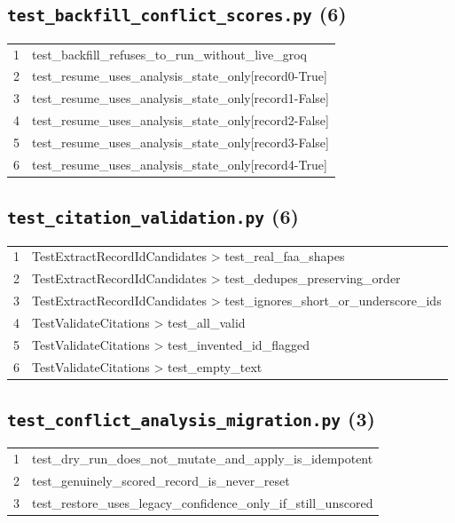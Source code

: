 \subsection*{\texttt{test\_backfill\_conflict\_scores.py} (6)}
\begin{longtable}{p{}p{}}
1 & test\_backfill\_refuses\_to\_run\_without\_live\_groq \\
2 & test\_resume\_uses\_analysis\_state\_only[record0-True] \\
3 & test\_resume\_uses\_analysis\_state\_only[record1-False] \\
4 & test\_resume\_uses\_analysis\_state\_only[record2-False] \\
5 & test\_resume\_uses\_analysis\_state\_only[record3-False] \\
6 & test\_resume\_uses\_analysis\_state\_only[record4-True] \\
\end{longtable}
\subsection*{\texttt{test\_citation\_validation.py} (6)}
\begin{longtable}{p{}p{}}
1 & TestExtractRecordIdCandidates > test\_real\_faa\_shapes \\
2 & TestExtractRecordIdCandidates > test\_dedupes\_preserving\_order \\
3 & TestExtractRecordIdCandidates > test\_ignores\_short\_or\_underscore\_ids \\
4 & TestValidateCitations > test\_all\_valid \\
5 & TestValidateCitations > test\_invented\_id\_flagged \\
6 & TestValidateCitations > test\_empty\_text \\
\end{longtable}
\subsection*{\texttt{test\_conflict\_analysis\_migration.py} (3)}
\begin{longtable}{p{}p{}}
1 & test\_dry\_run\_does\_not\_mutate\_and\_apply\_is\_idempotent \\
2 & test\_genuinely\_scored\_record\_is\_never\_reset \\
3 & test\_restore\_uses\_legacy\_confidence\_only\_if\_still\_unscored \\
\end{longtable}
